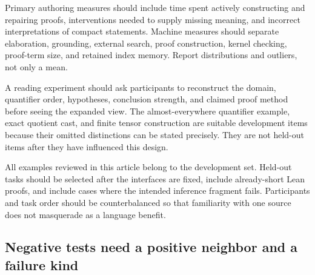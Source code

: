\documentclass[11pt,a4paper]{article}
\theoremstyle{definition}
\theoremstyle{remark}
\begin{document}
Primary authoring measures should include time spent actively constructing and
repairing proofs, interventions needed to supply missing meaning, and incorrect
interpretations of compact statements. Machine measures should separate
elaboration, grounding, external search, proof construction, kernel checking,
proof-term size, and retained index memory. Report distributions and outliers,
not only a mean.

A reading experiment should ask participants to reconstruct the domain,
quantifier order, hypotheses, conclusion strength, and claimed proof method
before seeing the expanded view. The almost-everywhere quantifier example,
exact quotient cast, and finite tensor construction are suitable development
items because their omitted distinctions can be stated precisely. They are
not held-out items after they have influenced this design.

All examples reviewed in this article belong to the development set. Held-out
tasks should be selected after the interfaces are fixed, include already-short
Lean proofs, and include cases where the intended inference fragment fails.
Participants and task order should be counterbalanced so that familiarity with
one source does not masquerade as a language benefit.

\subsection{Negative tests need a positive neighbor and a failure kind}
\end{document}
